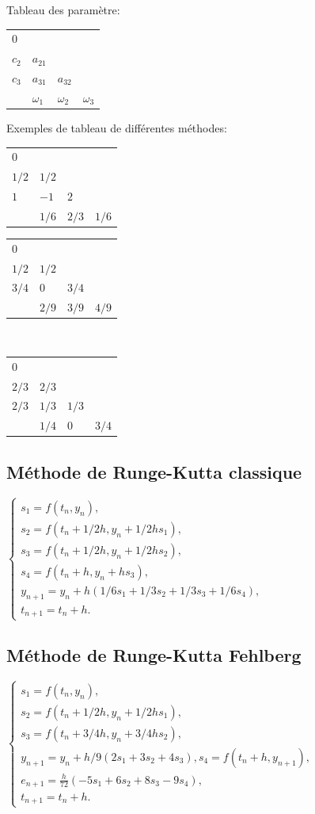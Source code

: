 \documentclass[a4paper,9pt]{extarticle}
\begin{document}
\begin{multicols*}{2}
Tableau des paramètre:\\
\begin{tabular}{l|lll}
$0$   &            &            &            \\
$c_2$ & $a_{21}$   &            &            \\
$c_3$ & $a_{31}$   & $a_{32}$   &            \\ \hline
      & $\omega_1$ & $\omega_2$ & $\omega_3$
\end{tabular}

Exemples de tableau de différentes méthodes:\\
\begin{tabular}{l|lll}
$0$   &       &       &       \\
$1/2$ & $1/2$ &       &       \\
$1$   & $-1$  & $2$   &       \\ \hline
      & $1/6$ & $2/3$ & $1/6$
\end{tabular}
\begin{tabular}{l|lll}
$0$   &       &       &       \\
$1/2$ & $1/2$ &       &       \\
$3/4$ & $0$   & $3/4$ &       \\ \hline
      & $2/9$ & $3/9$ & $4/9$
\end{tabular}\\
\begin{tabular}{l|lll}
$0$   &       &       &       \\
$2/3$ & $2/3$ &       &       \\
$2/3$ & $1/3$ & $1/3$ &       \\ \hline
      & $1/4$ & $0$   & $3/4$
\end{tabular}

\subsection{Méthode de Runge-Kutta classique}
$
\begin{cases}
	s_1 = f(t_n,y_n),\\
	s_2 = f(t_n+1/2h,y_n+1/2hs_1),\\
	s_3 = f(t_n + 1/2h,y_n+1/2hs_2), \\
	s_4 = f(t_n + h,y_n+hs_3),\\
	y_{n+1} = y_n + h(1/6s_1 + 1/3s_2 + 1/3s_3 + 1/6s_4),\\
	t_{n+1} =t_n + h.
\end{cases}
$
\subsection{Méthode de Runge-Kutta Fehlberg}
$
\begin{cases}
	s_1 = f(t_n,y_n),\\
	s_2 = f(t_n+1/2h,y_n+1/2hs_1),\\
	s_3 = f(t_n + 3/4h,y_n+3/4hs_2), \\
	y_{n+1} = y_n + h/9(2s_1 + 3s_2 + 4s_3),
	s_4 = f(t_n + h,y_{n+1}),\\
	e_{n+1}=\frac{h}{72}(-5s_1+6s_2+8s_3-9s_4),\\
	t_{n+1} =t_n + h.
\end{cases}
$

\end{multicols*}
\end{document}
